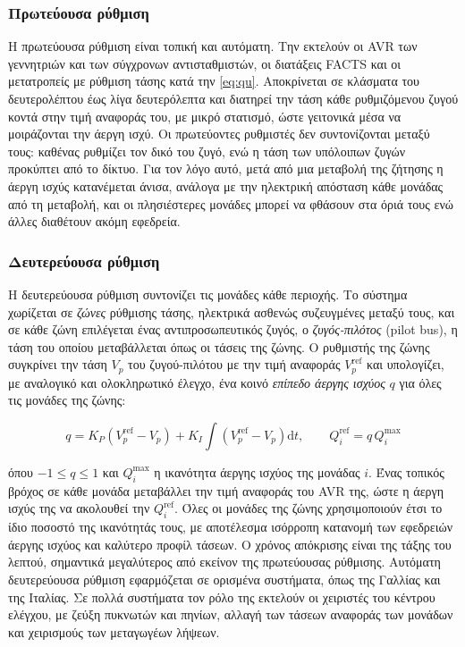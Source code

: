 \subsubsection{Πρωτεύουσα ρύθμιση}

Η πρωτεύουσα ρύθμιση είναι τοπική και αυτόματη. Την εκτελούν οι AVR των γεννητριών και των
σύγχρονων αντισταθμιστών, οι διατάξεις FACTS και οι μετατροπείς με ρύθμιση τάσης κατά την
\eqref{eq:qu}. Αποκρίνεται σε κλάσματα του δευτερολέπτου έως λίγα δευτερόλεπτα και διατηρεί
την τάση κάθε ρυθμιζόμενου ζυγού κοντά στην τιμή αναφοράς του, με μικρό στατισμό, ώστε
γειτονικά μέσα να μοιράζονται την άεργη ισχύ. Οι πρωτεύοντες ρυθμιστές δεν συντονίζονται μεταξύ
τους: καθένας ρυθμίζει τον δικό του ζυγό, ενώ η τάση των υπόλοιπων ζυγών προκύπτει από το
δίκτυο. Για τον λόγο αυτό, μετά από μια μεταβολή της ζήτησης η άεργη ισχύς κατανέμεται άνισα,
ανάλογα με την ηλεκτρική απόσταση κάθε μονάδας από τη μεταβολή, και οι πλησιέστερες μονάδες
μπορεί να φθάσουν στα όριά τους ενώ άλλες διαθέτουν ακόμη εφεδρεία.

\subsubsection{Δευτερεύουσα ρύθμιση}

Η δευτερεύουσα ρύθμιση συντονίζει τις μονάδες κάθε περιοχής. Το σύστημα χωρίζεται σε
\emph{ζώνες} ρύθμισης τάσης, ηλεκτρικά ασθενώς συζευγμένες μεταξύ τους, και σε κάθε ζώνη
επιλέγεται ένας αντιπροσωπευτικός ζυγός, ο \emph{ζυγός-πιλότος} (pilot bus), η τάση του οποίου
μεταβάλλεται όπως οι τάσεις της ζώνης. Ο ρυθμιστής της ζώνης συγκρίνει την τάση $V_p$ του
ζυγού-πιλότου με την τιμή αναφοράς $V_p^{\mathrm{ref}}$ και υπολογίζει, με αναλογικό και
ολοκληρωτικό έλεγχο, ένα κοινό \emph{επίπεδο άεργης ισχύος} $q$ για όλες τις μονάδες της ζώνης:

\begin{equation}
q = K_P \left(V_p^{\mathrm{ref}} - V_p\right)
  + K_I \int \left(V_p^{\mathrm{ref}} - V_p\right) \mathrm{d}t, \qquad
Q_i^{\mathrm{ref}} = q\,Q_i^{\max}
\label{eq:svr}
\end{equation}

όπου $-1 \le q \le 1$ και $Q_i^{\max}$ η ικανότητα άεργης ισχύος της μονάδας $i$. Ένας τοπικός
βρόχος σε κάθε μονάδα μεταβάλλει την τιμή αναφοράς του AVR της, ώστε η άεργη ισχύς της να
ακολουθεί την $Q_i^{\mathrm{ref}}$. Όλες οι μονάδες της ζώνης χρησιμοποιούν έτσι το ίδιο ποσοστό
της ικανότητάς τους, με αποτέλεσμα ισόρροπη κατανομή των εφεδρειών άεργης ισχύος και καλύτερο
προφίλ τάσεων. Ο χρόνος απόκρισης είναι της τάξης του λεπτού, σημαντικά μεγαλύτερος από εκείνον
της πρωτεύουσας ρύθμισης. Αυτόματη δευτερεύουσα ρύθμιση εφαρμόζεται σε ορισμένα συστήματα,
όπως της Γαλλίας και της Ιταλίας. Σε πολλά συστήματα τον ρόλο της εκτελούν οι χειριστές του
κέντρου ελέγχου, με ζεύξη πυκνωτών και πηνίων, αλλαγή των τάσεων αναφοράς των μονάδων και
χειρισμούς των μεταγωγέων λήψεων.

